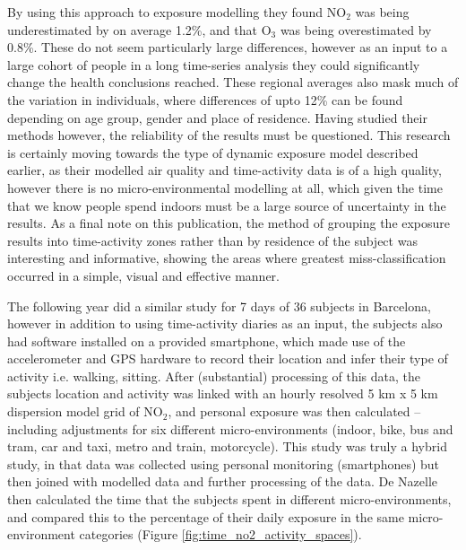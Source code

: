 By using this approach to exposure modelling they found NO$_{2}$ was being underestimated by on average 1.2\%, and that O$_{3}$ was being overestimated by 0.8\%. These do not seem particularly large differences, however as an input to a large cohort of people in a long time-series analysis they could significantly change the health conclusions reached. These regional averages also mask much of the variation in individuals, where differences of upto 12\% can be found depending on age group, gender and place of residence. Having studied their methods however, the reliability of the results must be questioned. This research is certainly moving towards the type of dynamic exposure model described earlier, as their modelled air quality and time-activity data is of a high quality, however there is no micro-environmental modelling at all, which given the time that we know people spend indoors must be a large source of uncertainty in the results. As a final note on this publication, the method of grouping the exposure results into time-activity zones rather than by residence of the subject was interesting and informative, showing the areas where greatest miss-classification occurred in a simple, visual and effective manner.


The following year \cite{DeNazelle2013} did a similar study for 7 days of 36 subjects in Barcelona, however in addition to using time-activity diaries as an input, the subjects also had software installed on a provided smartphone, which made use of the accelerometer and GPS hardware to record their location and infer their type of activity i.e. walking, sitting. After (substantial) processing of this data, the subjects location and activity was linked with an hourly resolved 5 km x 5 km dispersion model grid of NO$_{2}$, and personal exposure was then calculated -- including adjustments for six different micro-environments (indoor, bike, bus and tram, car and taxi, metro and train, motorcycle). This study was truly a hybrid study, in that data was collected using personal monitoring (smartphones) but then joined with modelled data and further processing of the data. De Nazelle then calculated the time that the subjects spent in different micro-environments, and compared this to the percentage of their daily exposure in the same micro-environment categories (Figure \ref{fig:time_no2_activity_spaces}).


